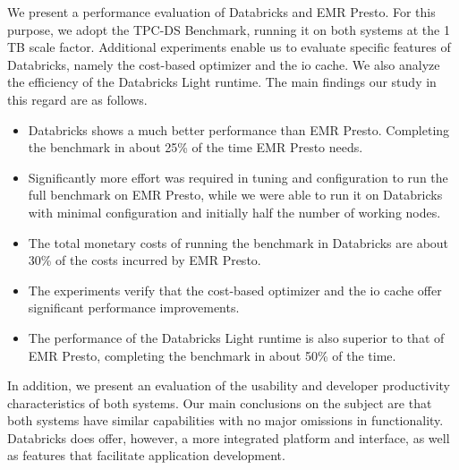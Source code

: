 We present a performance evaluation of Databricks and EMR Presto. For this purpose, we adopt the TPC-DS Benchmark, running it on both systems at the 1 TB scale factor. Additional experiments enable us to evaluate specific features of Databricks, namely the cost-based optimizer and the io cache. We also analyze the efficiency of the Databricks Light runtime. The main findings our study in this regard are as follows.

\begin{itemize}
\item Databricks shows a much better performance than EMR Presto. Completing the benchmark in about 25\% of the time EMR Presto needs.
\item	Significantly more effort was required in tuning and configuration to run the full benchmark on EMR Presto, while we were able to run it on Databricks with minimal configuration and initially half the number of working nodes.
\item	The total monetary costs of running the benchmark in Databricks are about 30\% of the costs incurred by EMR Presto.
\item	The experiments verify that the cost-based optimizer and the io cache offer significant performance improvements.
\item	The performance of the Databricks Light runtime is also superior to that of EMR Presto, completing the benchmark in about 50\% of the time.
\end{itemize}
In addition, we present an evaluation of the usability and developer productivity characteristics of both systems. Our main conclusions on the subject are that both systems have similar capabilities with no major omissions in functionality. Databricks does offer, however, a more integrated platform and interface, as well as features that facilitate application development.


